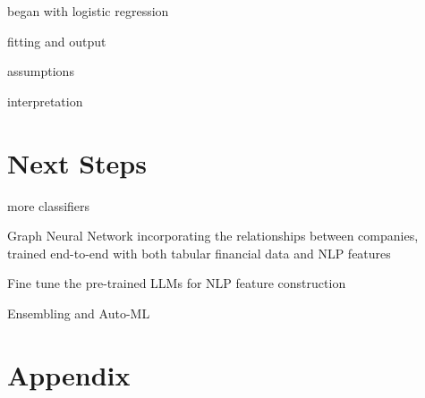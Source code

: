 \documentclass{article}
\begin{document}
    began with logistic regression

    fitting and output

    assumptions
    
    interpretation

    \section*{Next Steps}

    more classifiers

    Graph Neural Network incorporating the relationships between companies, trained end-to-end with both tabular financial data and NLP features
    
    Fine tune the pre-trained LLMs for NLP feature construction
    
    Ensembling and Auto-ML
    
    \clearpage
    \newpage

    
    

    \clearpage
    \newpage

    \appendix

    \section*{Appendix}
\end{document}
